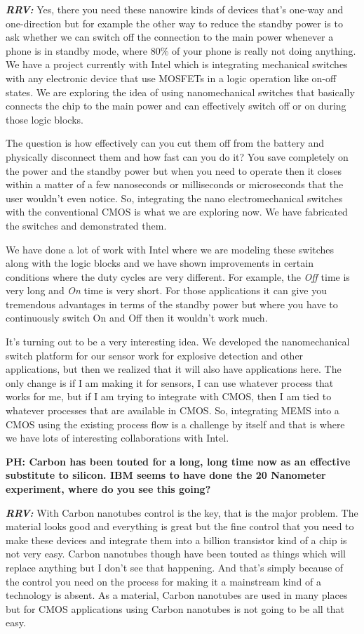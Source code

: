 \begin{multicols}{2}
\textbf{\textit{RRV:}} Yes, there you need these nanowire kinds of devices that’s one-way and one-direction but for example the other way to reduce the standby power is to ask whether we can switch off the connection to the main power whenever a phone is in standby mode, where 80\% of your phone is really not doing anything. We have a project currently with Intel which is integrating mechanical switches with any electronic device that use MOSFETs in a logic operation like on-off states. We are exploring the idea of using nanomechanical switches that basically connects the chip to the main power and can effectively switch off or on during those logic blocks.

The question is how effectively can you cut them off from the battery and physically disconnect them and how fast can you do it?  You save completely on the power and the standby power but when you need to operate then it closes within a matter of a few nanoseconds or milliseconds or microseconds that the user wouldn’t even notice. So, integrating the nano electromechanical switches with the conventional CMOS is what we are exploring now. We have fabricated the switches and demonstrated them.

We have done a lot of work with Intel where we are modeling these switches along with the logic blocks and we have shown improvements in certain conditions where the duty cycles are very different. For example, the \textit{Off} time is very long and \textit{On} time is very short. For those applications it can give you tremendous advantages in terms of the standby power but where you have to continuously switch On and Off then it wouldn’t work much.

It’s turning out to be a very interesting idea. We developed the nanomechanical switch platform for our sensor work for explosive detection and other applications, but then we realized that it will also have applications here. The only change is if I am making it for sensors, I can use whatever process that works for me, but if I am trying to integrate with CMOS, then I am tied to whatever processes that are available in CMOS. So, integrating MEMS into a CMOS using the existing process flow is a challenge by itself and that is where we have lots of interesting collaborations with Intel.

\textbf{PH: Carbon has been touted for a long, long time now as an effective substitute to silicon. IBM seems to have done the 20 Nanometer experiment, where do you see this going?}

\textbf{\textit{RRV:}} With Carbon nanotubes control is the key, that is the major problem. The material looks good and everything is great but the fine control that you need to make these devices and integrate them into a billion transistor kind of a chip is not very easy. Carbon nanotubes though have been touted as things which will replace anything but I don’t see that happening. And that’s simply because of the control you need on the process for making it a mainstream kind of a technology is absent. As a material, Carbon nanotubes are used in many places but for CMOS applications using Carbon nanotubes is not going to be all that easy.


\end{multicols}
